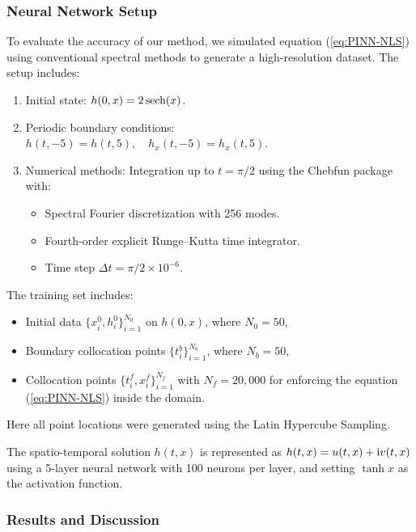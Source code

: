 \subsubsection{Neural Network Setup}
To evaluate the accuracy of our method, we simulated equation (\ref{eq:PINN-NLS}) using conventional spectral methods to generate a high-resolution dataset. The setup includes:
\begin{enumerate}
    \item Initial state: $h(0, x) = 2 \, \text{sech}(x)$.
    \item Periodic boundary conditions: $h(t, -5) = h(t, 5), \quad h_x(t, -5) = h_x(t, 5) $.
    \item Numerical methods: Integration up to $t = \pi/2$ using the Chebfun package with:
    \begin{itemize}
        \item Spectral Fourier discretization with 256 modes.
        \item Fourth-order explicit Runge–Kutta time integrator.
        \item Time step $\Delta t = \pi/2 \times 10^{-6}$.
    \end{itemize}
\end{enumerate}
The training set includes:
\begin{itemize}
    \item Initial data $ \{x_i^0, h_i^0\}_{i=1}^{N_0} $ on $ h(0,x) $, where $ N_0 = 50 $,
    \item Boundary collocation points $ \{t_i^b\}_{i=1}^{N_b} $, where $ N_b = 50 $,
    \item Collocation points $ \{t_i^f, x_i^f\}_{i=1}^{N_f} $ with $ N_f = 20,000 $ for enforcing the equation (\ref{eq:PINN-NLS}) inside the domain.
\end{itemize}
Here all point locations were generated using the Latin Hypercube Sampling.

The spatio-temporal solution $h(t, x)$ is represented as $h(t, x) = u(t, x) + \mathrm{i} v(t, x) $ using a 5-layer neural network with 100 neurons per layer, and setting $ \tanh x $ as the activation function. 

\subsubsection{Results and Discussion}

